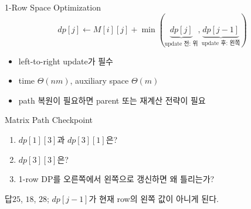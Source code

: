 \begin{frame}{1-Row Space Optimization}
\[
dp[j]\gets M[i][j]+\min(\underbrace{dp[j]}_{\text{update 전: 위}},
\underbrace{dp[j-1]}_{\text{update 후: 왼쪽}})
\]
\begin{itemize}\item left-to-right update가 필수\item time $\Theta(nm)$, auxiliary space $\Theta(m)$\item path 복원이 필요하면 parent 또는 재계산 전략이 필요\end{itemize}
\end{frame}
\begin{frame}{Matrix Path Checkpoint}
\begin{enumerate}\item $dp[1][3]$과 $dp[3][1]$은?\item $dp[3][3]$은?\item 1-row DP를 오른쪽에서 왼쪽으로 갱신하면 왜 틀리는가?\end{enumerate}
\begin{exampleblock}{답}$25$, $18$, $28$; $dp[j-1]$가 현재 row의 왼쪽 값이 아니게 된다.\end{exampleblock}
\vfill{}
\end{frame}
